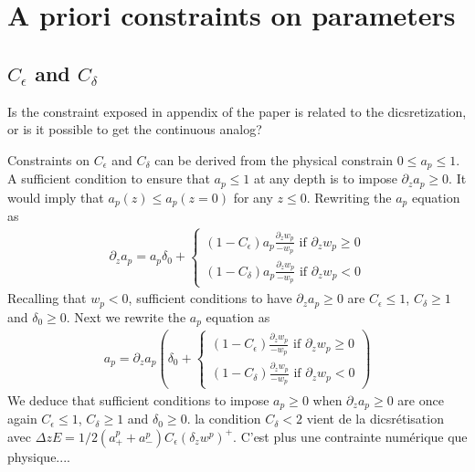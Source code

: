 \documentclass[draft]{agujournal2019}
\newcommand{\parenthese}[1]{\ensuremath{\left(#1\right)}} %
\newcommand{\blu}[1]{{\color{BlueGreen} #1}}
\begin{document}
\section{A priori constraints on parameters}
%
\subsection{$C_\epsilon$ and $C_\delta$}

\blu{Is the constraint exposed in appendix of the paper is related to the dicsretization, or is it possible to get the continuous analog?}

Constraints on $C_\epsilon$ and $C_\delta$ can be derived from the physical constrain $0\leq a_p \leq 1$. A sufficient condition to ensure that $a_p \leq 1$ at any depth is to impose $\partial_z a_p \geq 0$. It would imply that $a_p(z) \leq a_p(z=0)$ for any $z \leq 0$. Rewriting the $a_p$ equation as
%
\begin{eqnarray*}
    \partial_z a_p = a_p \delta_0 + 
    \begin{cases}
        (1-C_\epsilon) a_p \frac{\partial_z w_p}{-w_p} \text{ if } \partial_z w_p \geq 0
        \\
        (1-C_\delta) a_p \frac{\partial_z w_p}{-w_p} \text{ if } \partial_z w_p < 0             
    \end{cases}
\end{eqnarray*}
%
Recalling that $w_p<0$, sufficient conditions to have $\partial_z a_p \geq0$ are $C_\epsilon \leq 1$, $C_\delta \geq 1$ and $\delta_0 \geq 0$. Next we rewrite the $a_p$ equation as
%
\begin{eqnarray*}
    a_p = \partial_z a_p \parenthese{ \delta_0 +  
    \begin{cases}
        (1-C_\epsilon)\frac{\partial_z w_p}{-w_p} \text{ if } \partial_z w_p \geq 0
        \\
        (1-C_\delta)  \frac{\partial_z w_p}{-w_p} \text{ if } \partial_z w_p < 0              \end{cases}
    }
\end{eqnarray*}
%
We deduce that sufficient conditions to impose $a_p\geq 0$ when $\partial_z a_p \geq 0$ are once again $C_\epsilon \leq 1$, $C_\delta \geq 1$ and $\delta_0 \geq 0$. \blu{la condition $C_\delta < 2$ vient de la dicsrétisation avec $\Delta z E = 1/2 (a^p_+ + a^p_-) C_\epsilon (\delta_z w^p)^+$. C'est plus une contrainte numérique que physique...}. 
\end{document}
